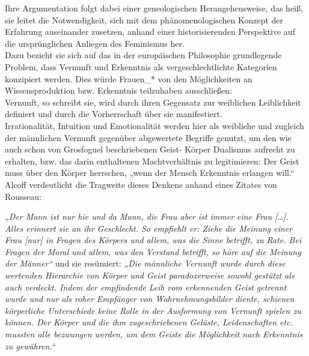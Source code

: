 \noindent Ihre Argumentation folgt dabei
einer geneologischen Herangehensweise, das heiß, sie leitet die Notwendigkeit,
sich mit dem phänomenologischen Konzept der Erfahrung auseinander zusetzen,
anhand einer historisierenden Perspektive auf die ursprünglichen Anliegen des
Feminismus her. \\
Dazu bezieht sie sich auf das in der europäischen Philosophie
grundlegende Problem, dass Vernunft und Erkenntnis als vergeschlechtlichte
Kategorien konzipiert werden. Dies würde Frauen\_* von den Möglichkeiten an
Wissensproduktion bzw. Erkenntnis teilzuhaben ausschließen: \\
Vernunft, so
schreibt sie, wird durch ihren Gegensatz zur weiblichen Leiblichkeit definiert
und durch die Vorherrschaft über sie manifestiert.\footnotemark{} \\
Irrationalität, Intuition und
Emotionalität werden hier als weibliche und zugleich der männlichen Vernunft
gegenüber abgewertete Begriffe genutzt, um den wie auch schon von Grosfoguel
beschriebenen Geist- Körper Dualismus aufrecht zu erhalten, bzw. das darin
enthaltenen Machtverhältnis zu legitimieren: Der Geist muss über den Körper
herrschen, „wenn der Mensch Erkenntnis erlangen will.“\footnotemark
{}\\
Alcoff verdeutlicht die Tragweite dieses Denkens anhand eines Zitates von Rousseau:
\begin{myenv}
 \textit{
 „Der Mann ist nur hie und da Mann, die Frau aber ist immer eine Frau
 […]. Alles erinnert sie an ihr Geschlecht. So empfiehlt er: Ziehe die Meinung
 einer Frau [nur] in Fragen des Körpers und allem, was die Sinne betrifft, zu
 Rate. Bei Fragen der Moral und allem, was den Verstand betrifft, so höre auf
 die Meinung der Männer“\footnotemark {}} und sie resümiert: \textit{ „Die männliche Vernunft wurde
 durch diese wertenden Hierarchie von Körper und Geist paradoxerweise sowohl
 gestützt als auch verdeckt. Indem der empfindende Leib vom erkennenden Geist
 getrennt wurde und nur als roher Empfänger von Wahrnehmungsbilder diente,
 schienen körperliche Unterschiede keine Rolle in der Ausformung von Vernunft
 spielen zu können. Der Körper und die ihm zugeschriebenen Gelüste,
 Leidenschaften etc. mussten alle bezwungen werden, um dem Geiste die
Möglichkeit nach Erkenntnis zu gewähren.“\footnotemark {} } \end{myenv}
